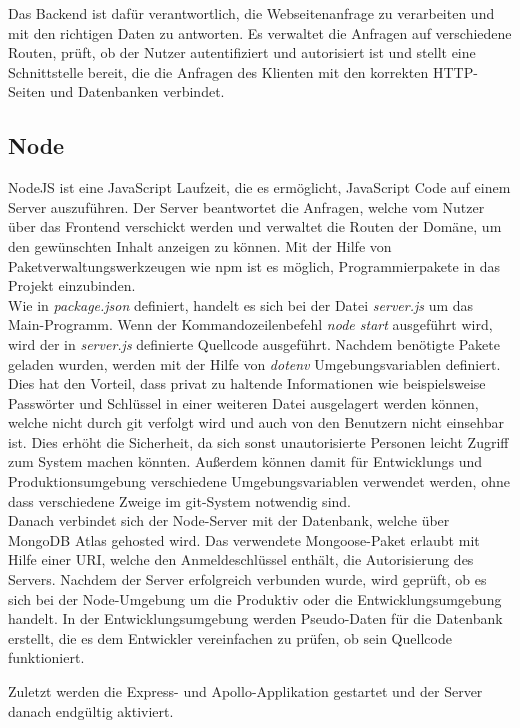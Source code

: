 Das Backend ist dafür verantwortlich, die Webseitenanfrage zu verarbeiten und mit den richtigen Daten zu antworten. Es verwaltet die Anfragen auf verschiedene Routen, prüft, ob der Nutzer autentifiziert und autorisiert ist und stellt eine Schnittstelle bereit, die die Anfragen des Klienten mit den korrekten HTTP-Seiten und Datenbanken verbindet.

\subsection{Node}
NodeJS ist eine JavaScript Laufzeit, die es ermöglicht, JavaScript Code auf einem Server auszuführen. Der Server beantwortet die Anfragen, welche vom Nutzer über das Frontend verschickt werden und verwaltet die Routen der Domäne, um den gewünschten Inhalt anzeigen zu können. Mit der Hilfe von Paketverwaltungswerkzeugen wie npm ist es möglich, Programmierpakete in das Projekt einzubinden.\\

Wie in \textit{package.json} definiert, handelt es sich bei der Datei \textit{server.js} um das Main-Programm. Wenn der Kommandozeilenbefehl \textit{node start} ausgeführt wird, wird der in \textit{server.js} definierte Quellcode ausgeführt.
Nachdem benötigte Pakete geladen wurden, werden mit der Hilfe von \textit{dotenv} Umgebungsvariablen definiert. Dies hat den Vorteil, dass privat zu haltende Informationen wie beispielsweise Passwörter und Schlüssel in einer weiteren Datei ausgelagert werden können, welche nicht durch git verfolgt wird und auch von den Benutzern nicht einsehbar ist. Dies erhöht die Sicherheit, da sich sonst unautorisierte Personen leicht Zugriff zum System machen könnten. Außerdem können damit für Entwicklungs und Produktionsumgebung verschiedene Umgebungsvariablen verwendet werden, ohne dass verschiedene Zweige im git-System notwendig sind.\\

Danach verbindet sich der Node-Server mit der Datenbank, welche über MongoDB Atlas gehosted wird. Das verwendete Mongoose-Paket erlaubt mit Hilfe einer URI, welche den Anmeldeschlüssel enthält, die Autorisierung des Servers. Nachdem der Server erfolgreich verbunden wurde, wird geprüft, ob es sich bei der Node-Umgebung um die Produktiv oder die Entwicklungsumgebung handelt. In der Entwicklungsumgebung werden Pseudo-Daten für die Datenbank erstellt, die es dem Entwickler vereinfachen zu prüfen, ob sein Quellcode funktioniert.

Zuletzt werden die Express- und Apollo-Applikation gestartet und der Server danach endgültig aktiviert.

